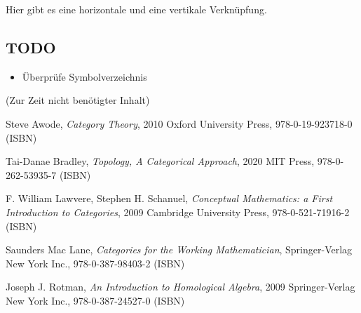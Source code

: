 \documentclass[a4paper]{amsart}
\theoremstyle{definition}
\begin{document}
Hier gibt es eine horizontale und eine vertikale Verknüpfung.

\begin{backup}
\section{TODO}

\begin{itemize}
     \item Überprüfe Symbolverzeichnis
\end{itemize}

\end{backup}

\begin{backup}
    (Zur Zeit nicht benötigter Inhalt)
\end{backup}

\begin{thebibliography}{9}
      Steve Awode, \emph{Category Theory},
      2010 Oxford University Press, 978-0-19-923718-0 (ISBN)

      Tai-Danae Bradley, \emph{Topology, A Categorical Approach},
      2020 MIT Press, 978-0-262-53935-7 (ISBN)

      F. William Lawvere, Stephen H. Schanuel, \emph{Conceptual Mathematics: a First Introduction to Categories},
      2009 Cambridge University Press, 978-0-521-71916-2 (ISBN)

      Saunders Mac Lane, \emph{Categories for the Working Mathematician},
      Springer-Verlag New York Inc., 978-0-387-98403-2 (ISBN)

   	Joseph J. Rotman, \emph{An Introduction to Homological Algebra},
   	2009 Springer-Verlag New York Inc., 978-0-387-24527-0 (ISBN)

\end{thebibliography}
\end{document}
